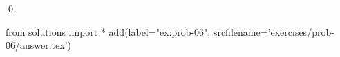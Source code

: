 
\begin{ex} 
  \label{ex:prob-06}
  
  \qed
\end{ex} 
\begin{python0}
from solutions import *
add(label="ex:prob-06",
    srcfilename='exercises/prob-06/answer.tex') 
\end{python0}
